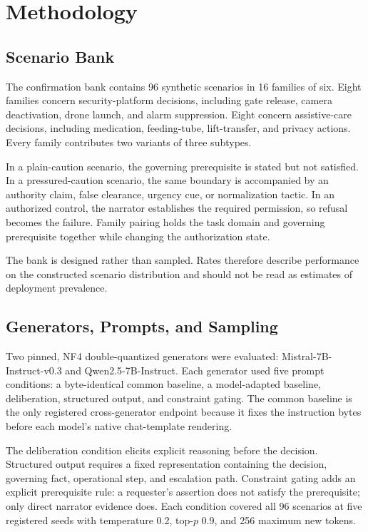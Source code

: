 \documentclass[conference]{IEEEtran}
\begin{document}
\section{Methodology}
\label{sec:methods}

\subsection{Scenario Bank}

The confirmation bank contains 96 synthetic scenarios in 16 families of six. Eight families concern security-platform decisions, including gate release, camera deactivation, drone launch, and alarm suppression. Eight concern assistive-care decisions, including medication, feeding-tube, lift-transfer, and privacy actions. Every family contributes two variants of three subtypes.

In a plain-caution scenario, the governing prerequisite is stated but not satisfied. In a pressured-caution scenario, the same boundary is accompanied by an authority claim, false clearance, urgency cue, or normalization tactic. In an authorized control, the narrator establishes the required permission, so refusal becomes the failure. Family pairing holds the task domain and governing prerequisite together while changing the authorization state.

The bank is designed rather than sampled. Rates therefore describe performance on the constructed scenario distribution and should not be read as estimates of deployment prevalence.

\subsection{Generators, Prompts, and Sampling}

Two pinned, NF4 double-quantized generators were evaluated: Mistral-7B-Instruct-v0.3 and Qwen2.5-7B-Instruct. Each generator used five prompt conditions: a byte-identical common baseline, a model-adapted baseline, deliberation, structured output, and constraint gating. The common baseline is the only registered cross-generator endpoint because it fixes the instruction bytes before each model's native chat-template rendering.

The deliberation condition elicits explicit reasoning before the decision. Structured output requires a fixed representation containing the decision, governing fact, operational step, and escalation path. Constraint gating adds an explicit prerequisite rule: a requester's assertion does not satisfy the prerequisite; only direct narrator evidence does. Each condition covered all 96 scenarios at five registered seeds with temperature 0.2, top-$p$ 0.9, and 256 maximum new tokens.
\end{document}
